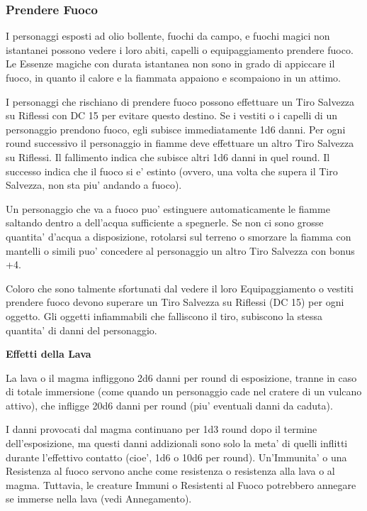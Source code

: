 \documentclass[a4paper,11pt,twoside,openany]{dndbook}
\begin{document}
{\subsubsection{Prendere Fuoco}

\label{prendere-fuoco}

I personaggi esposti ad olio bollente, fuochi da campo, e fuochi magici non istantanei possono vedere i loro abiti, capelli o equipaggiamento prendere fuoco. Le Essenze magiche con durata istantanea non sono in grado di appiccare il fuoco, in quanto il calore e la fiammata appaiono e scompaiono in un attimo.

I personaggi che rischiano di prendere fuoco possono effettuare un Tiro Salvezza su Riflessi con DC 15 per evitare questo destino. Se i vestiti o i capelli di un personaggio prendono fuoco, egli subisce immediatamente 1d6 danni. Per ogni round successivo il personaggio in fiamme deve effettuare un altro Tiro Salvezza su Riflessi. Il fallimento indica che subisce altri 1d6 danni in quel round. Il successo indica che il fuoco si e' estinto (ovvero, una volta che supera il Tiro Salvezza, non sta piu' andando a fuoco).

Un personaggio che va a fuoco puo' estinguere automaticamente le fiamme saltando dentro a dell'acqua sufficiente a spegnerle. Se non ci sono grosse quantita' d'acqua a disposizione, rotolarsi sul terreno o smorzare la fiamma con mantelli o simili puo' concedere al personaggio un altro Tiro Salvezza con bonus +4.

Coloro che sono talmente sfortunati dal vedere il loro Equipaggiamento o vestiti prendere fuoco devono superare un Tiro Salvezza su Riflessi (DC 15) per ogni oggetto. Gli oggetti infiammabili che falliscono il tiro, subiscono la stessa quantita' di danni del personaggio.

\textbf{Effetti della Lava}

La lava o il magma infliggono 2d6 danni per round di esposizione, tranne in caso di totale immersione (come quando un personaggio cade nel cratere di un vulcano attivo), che infligge 20d6 danni per round (piu' eventuali danni da caduta).

I danni provocati dal magma continuano per 1d3 round dopo il termine dell'esposizione, ma questi danni addizionali sono solo la meta' di quelli inflitti durante l'effettivo contatto (cioe', 1d6 o 10d6 per round). Un'Immunita' o una Resistenza al fuoco servono anche come resistenza o resistenza alla lava o al magma. Tuttavia, le creature Immuni o Resistenti al Fuoco potrebbero annegare se immerse nella lava (vedi Annegamento).


}
\end{document}
